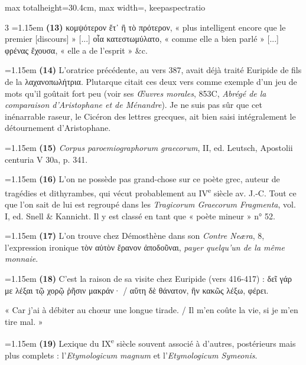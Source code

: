 \documentclass[11pt,twoside]{book}
\newcommand{\italique}[1]{\textit{#1}}
\newcommand{\nieme}[1]{#1\textsuperscript{e}}
\newcommand{\latin}[1]{\textit{#1}}
\begin{document}
\begin{adjustbox}{max totalheight=30.4cm, max width=\textwidth, keepaspectratio}
\begin{minipage}{\textwidth}
{\begin{multicols}{3}
\noindent\hangindent=1.15em {\color{sepiaNote}\textbf{(13)}} κομψότερον ἔτ᾽ ἢ τὸ πρότερον, « plus intelligent encore que le premier [discours] » [...] οἷα κατεστωμύλατο, « comme elle a bien parlé » [...] φρένας ἔχουσα, « elle a de l'esprit » \&c.
\par\vspace{1.5pt}
\noindent\hangindent=1.15em {\color{sepiaNote}\textbf{(14)}} L'oratrice précédente, au vers 387, avait déjà traité Euripide de fils de la λαχανοπωλήτρια. Plutarque citait ces deux vers comme exemple d'un jeu de mots qu'il goûtait fort peu (voir ses \italique{Œuvres morales}, 853C, \italique{Abrégé de la comparaison d'Aristophane et de Ménandre}). Je ne suis pas sûr que cet inénarrable raseur, le Cicéron des lettres grecques, ait bien saisi intégralement le détournement d'Aristophane.
\par\vspace{1.5pt}
\noindent\hangindent=1.15em {\color{sepiaNote}\textbf{(15)}} \italique{Corpus paroemiographorum graecorum}, II, ed. Leutsch, Apostolii centuria V 30a, p. 341.
\par\vspace{1.5pt}
\noindent\hangindent=1.15em {\color{sepiaNote}\textbf{(16)}} L'on ne possède pas grand-chose sur ce poète grec, auteur de tragédies et dithyrambes, qui vécut probablement au \nieme{IV} siècle av. J.-C. Tout ce que l'on sait de lui est regroupé dans les \italique{Tragicorum Graecorum Fragmenta}, vol. I, ed. Snell \& Kannicht. Il y est classé en tant que « poète mineur » n° 52.
\par\vspace{1.5pt}
\noindent\hangindent=1.15em {\color{sepiaNote}\textbf{(17)}} L'on trouve chez Démosthène dans son \italique{Contre Neæra}, 8, l'expression ironique τὸν αὐτὸν ἔρανον ἀποδοῦναι, \italique{payer quelqu'un de la même monnaie}.
\par\vspace{1.5pt}
\noindent\hangindent=1.15em {\color{sepiaNote}\textbf{(18)}} C'est la raison de sa visite chez Euripide (vers 416-417) : δεῖ γάρ με λέξαι τῷ χορῷ ῥῆσιν μακράν· / αὕτη δὲ θάνατον, ἢν κακῶς λέξω, φέρει.
\par\vspace{1.5pt}
\noindent « Car j'ai à débiter au chœur une longue tirade. / Il m'en coûte la vie, si je m'en tire mal. »
\par\vspace{1.5pt}
\noindent\hangindent=1.15em {\color{sepiaNote}\textbf{(19)}} Lexique du \nieme{IX} siècle souvent associé à d'autres, postérieurs mais plus complets : l'\latin{Etymologicum magnum} et l'\latin{Etymologicum Symeonis}.

\end{multicols}}
\end{minipage}
\end{adjustbox}
\end{document}
